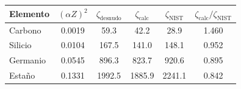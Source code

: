 \begin{tabular}{lccccc}
    \toprule
    \textbf{Elemento} & $(\alpha Z)^2$ & $\zeta_{\text{desnudo}}$ & $\zeta_{\text{calc}}$ & $\zeta_{\text{NIST}}$ & $\zeta_{\text{calc}}/\zeta_{\text{NIST}}$ \\
    \midrule
    Carbono & 0.0019 & 59.3 & 42.2 & 28.9 & 1.460 \\
    Silicio & 0.0104 & 167.5 & 141.0 & 148.1 & 0.952 \\
    Germanio & 0.0545 & 896.3 & 823.7 & 920.6 & 0.895 \\
    Estaño & 0.1331 & 1992.5 & 1885.9 & 2241.1 & 0.842 \\
    \bottomrule
\end{tabular}
